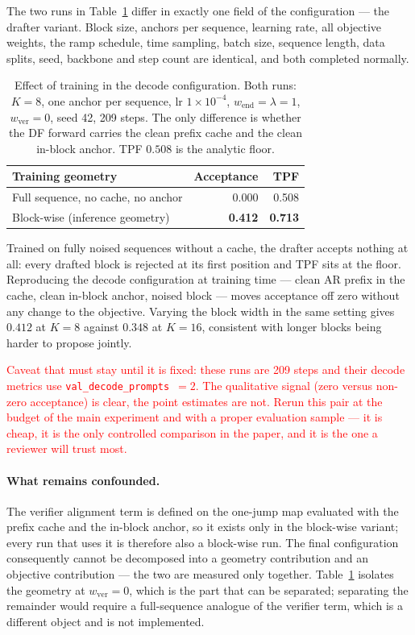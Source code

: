 \documentclass{zapiski}
\newcommand{\cm}[1]{\textcolor{red}{#1}}
\begin{document}
The two runs in Table~\ref{tab:geometry} differ in exactly one field of the
configuration --- the drafter variant. Block size, anchors per sequence,
learning rate, all objective weights, the ramp schedule, time sampling, batch
size, sequence length, data splits, seed, backbone and step count are
identical, and both completed normally.

\begin{table}[!tbh]
\centering
\begin{tabular}{lrr}
\toprule
Training geometry & Acceptance & TPF \\
\midrule
Full sequence, no cache, no anchor   & 0.000 & 0.508 \\
Block-wise (inference geometry)      & \textbf{0.412} & \textbf{0.713} \\
\bottomrule
\end{tabular}
\caption{Effect of training in the decode configuration. Both runs: $K=8$,
one anchor per sequence, lr $1\!\times\!10^{-4}$,
$w_{\mathrm{end}} = \lambda = 1$, $w_{\mathrm{ver}} = 0$, seed 42, 209 steps.
The only difference is whether the DF forward carries the clean prefix cache
and the clean in-block anchor. TPF $0.508$ is the analytic floor.}
\label{tab:geometry}
\end{table}

Trained on fully noised sequences without a cache, the drafter accepts nothing
at all: every drafted block is rejected at its first position and TPF sits at
the floor. Reproducing the decode configuration at training time --- clean AR
prefix in the cache, clean in-block anchor, noised block --- moves acceptance
off zero without any change to the objective. Varying the block width in the
same setting gives $0.412$ at $K=8$ against $0.348$ at $K=16$, consistent with
longer blocks being harder to propose jointly.

\cm{Caveat that must stay until it is fixed: these runs are 209 steps and their
decode metrics use \texttt{val\_decode\_prompts}~$=2$. The qualitative signal
(zero versus non-zero acceptance) is clear, the point estimates are not. Rerun
this pair at the budget of the main experiment and with a proper evaluation
sample --- it is cheap, it is the only controlled comparison in the paper, and
it is the one a reviewer will trust most.}

\paragraph{What remains confounded.} The verifier alignment term is defined on
the one-jump map evaluated with the prefix cache and the in-block anchor, so it
exists only in the block-wise variant; every run that uses it is therefore also
a block-wise run. The final configuration consequently cannot be decomposed
into a geometry contribution and an objective contribution --- the two are
measured only together. Table~\ref{tab:geometry} isolates the geometry at
$w_{\mathrm{ver}} = 0$, which is the part that can be separated; separating the
remainder would require a full-sequence analogue of the verifier term, which is
a different object and is not implemented.
\end{document}
